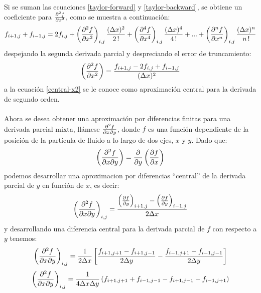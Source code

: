 \documentclass[letterpaper, openright, 12pt]{book}
\begin{document}
	\paragraph*{}
	Si se suman las ecuaciones \ref{taylor-forward} y \ref{taylor-backward}, se obtiene un coeficiente para $\pdv[2]{f}{x}$, como se muestra a continuación:
	\begin{equation*}
		f_{i+1,j} + f_{i-1, j} = 2 f_{i,j} + \left( \pdv[2]{f}{x} \right)_{i,j} \frac{(\Delta x) ^2}{2\,!} + \left( \pdv[4]{f}{x} \right)_{i,j} \frac{(\Delta x)^4}{4\,!} + ... + \left( \pdv[n]{f}{x} \right)_{i,j} \frac{(\Delta x)^n}{n\,!}
	\end{equation*}
	despejando la segunda derivada parcial y despreciando el error de truncamiento:
	\begin{equation}
	\left( \pdv[2]{f}{x} \right) = \frac{f_{i+1,j} - 2f_{i,j} + f_{i-1,j}}{(\Delta x)^2}
	\label{central-x2}
	\end{equation}
	a la ecuación \ref{central-x2} se le conoce como aproximación central para la derivada de segundo orden.
	
	\paragraph*{}
	Ahora se desea obtener una aproximación por diferencias finitas para una derivada parcial mixta, llámese $\pdv{f}{x}{y}$, donde $f$ es una función dependiente de la posición de la partícula de fluido a lo largo de dos ejes, $x$ y $y$. Dado que:
	\begin{equation}
	\left( \pdv{f}{x}{y} \right) = \pdv{y} \left( \pdv{f}{x} \right)
	\end{equation}
	podemos desarrollar una aproximacion por diferencias ``central'' de la derivada parcial de $y$ en función de $x$, es decir:
	\begin{equation}
	\left( \pdv{f}{x}{y} \right)_{i,j} = \frac{\left( \pdv{f}{y} \right)_{i+1, j} - \left( \pdv{f}{y} \right)_{i-1,j}}{2 \Delta x}
	\end{equation}
	y desarrollando una diferencia central para la derivada parcial de $f$ con respecto a $y$ tenemos:
	\begin{equation}
	\left( \pdv{f}{x}{y} \right)_{i,j} = \frac{1}{2 \Delta x} \left[ \frac{f_{i+1, j+1} - f_{i+1, j-1}}{2 \Delta y} - \frac{f_{i-1, j+1} - f_{i-1, j-1}}{2 \Delta y} \right]
	\end{equation}
	\begin{equation}
	\left( \pdv{f}{x}{y} \right)_{i,j} = \frac{1}{4 \Delta x \Delta y} \left( f_{i+1, j+1} + f_{i-1, j-1} - f_{i+1, j-1} - f_{i-1, j+1} \right)
	\end{equation}
	
\end{document}
